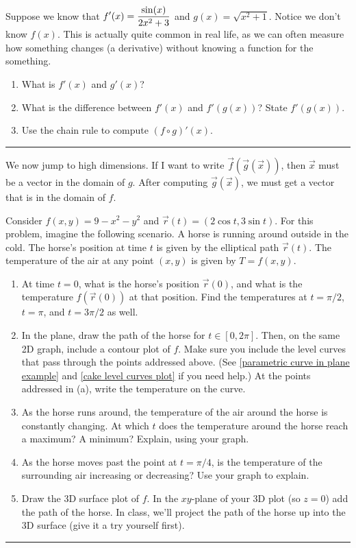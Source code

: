 \begin{problem}\label{chain rule review problem}
 Suppose we know that $\displaystyle f'(x) = \frac{\sin(x)}{2x^2+3}$ and $g(x)=\sqrt{x^2+1}$. Notice we don't know $f(x)$.  This is actually quite common in real life, as we can often measure how something changes (a derivative) without knowing a function for the something.
\begin{enumerate}
 \item What is $f'(x)$ and $g'(x)$?
 \item What is the difference between $f'(x)$ and $f'(g(x))$? State $f'(g(x))$.
 \item Use the chain rule to compute $(f\circ g)'(x)$.
\end{enumerate}
\hrule\end{problem}

We now jump to high dimensions. If I want to write $\vec f(\vec g(\vec x))$, then $\vec x$ must be a vector in the domain of $g$.  After computing $\vec g(\vec x)$, we must get a vector that is in the domain of $f$. 

\begin{problem}
 Consider $f(x,y)=9-x^2-y^2$ and $\vec r(t)=(2\cos t, 3\sin t)$. For this problem, imagine the following scenario.  A horse is running around outside in the cold. The horse's position at time $t$ is given by the elliptical path $\vec r(t)$. The temperature of the air at any point $(x,y)$ is given by $T=f(x,y)$.  
\begin{enumerate}
 \item At time $t=0$, what is the horse's position $\vec r(0)$, and what is the temperature $f(\vec r(0))$ at that position. Find the temperatures at $t=\pi/2$, $t=\pi$, and $t=3\pi/2$ as well. 
 \item In the plane, draw the path of the horse for $t\in [0,2\pi]$. Then, on the same 2D graph, include a contour plot of $f$. Make sure you include the level curves that pass through the points addressed above. (See  \ref{parametric curve in plane example} and \ref{cake level curves plot} if you need help.) At the points addressed in (a), write the temperature on the curve.
 \item{}%
 As the horse runs around, the temperature of the air around the horse is constantly changing. 
At which $t$ does the temperature around the horse reach a maximum?  A minimum?  Explain, using your graph. 
 \item As the horse moves past the point at $t=\pi/4$, is the temperature of the surrounding air increasing or decreasing? Use your graph to explain.
 \item Draw the 3D surface plot of $f$. In the $xy$-plane of your 3D plot (so $z=0$) add the path of the horse. In class, we'll project the path of the horse up into the 3D surface (give it a try yourself first). 
\end{enumerate}
\hrule\end{problem}

